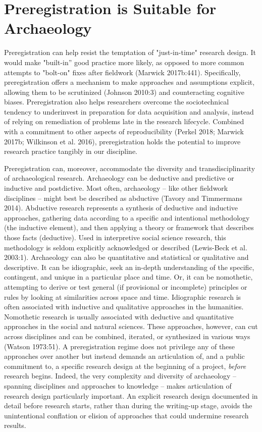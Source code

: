 \documentclass[article]{sa}
\begin{document}
\section{Preregistration is Suitable for
Archaeology}

Preregistration can help resist the temptation of "just-in-time"
research design. It would make "built-in'' good practice more likely, as
opposed to more common attempts to "bolt-on" fixes after fieldwork
(Marwick 2017b:441). Specifically, preregistration offers a mechanism to
make approaches and assumptions explicit, allowing them to be
scrutinized (Johnson 2010:3) and counteracting cognitive biases.
Preregistration also helps researchers overcome the sociotechnical
tendency to underinvest in preparation for data acquisition and
analysis, instead of relying on remediation of problems late in the
research lifecycle. Combined with a commitment to other aspects of
reproducibility (Perkel 2018; Marwick 2017b; Wilkinson et al. 2016),
preregistration holds the potential to improve research practice
tangibly in our discipline.

Preregistration can, moreover, accommodate the diversity and
transdisciplinarity of archaeological research. Archaeology can be
deductive and predictive or inductive and postdictive. Most often,
archaeology -- like other fieldwork disciplines -- might best be
described as abductive (Tavory and Timmermans 2014). Abductive research
represents a synthesis of deductive and inductive approaches, gathering
data according to a specific and intentional methodology (the inductive
element), and then applying a theory or framework that describes those
facts (deductive). Used in interpretive social science research, this
methodology is seldom explicitly acknowledged or described (Lewis-Beck
et al. 2003:1). Archaeology can also be quantitative and statistical or
qualitative and descriptive. It can be idiographic, seek an in-depth
understanding of the specific, contingent, and unique in a particular
place and time. Or, it can be nomothetic, attempting to derive or test
general (if provisional or incomplete) principles or rules by looking at
similarities across space and time. Idiographic research is often
associated with inductive and qualitative approaches in the humanities.
Nomothetic research is usually associated with deductive and
quantitative approaches in the social and natural sciences. These
approaches, however, can cut across disciplines and can be combined,
iterated, or synthesized in various ways (Watson 1973:51). A
preregistration regime does not privilege any of these approaches over
another but instead demands an articulation of, and a public commitment
to, a specific research design at the beginning of a project,
\emph{before} research begins. Indeed, the very complexity and diversity
of archaeology -- spanning disciplines and approaches to knowledge
-- makes articulation of research design particularly important. An
explicit research design documented in detail before research starts,
rather than during the writing-up stage, avoids the unintentional
conflation or elision of approaches that could undermine research
results.
\end{document}
